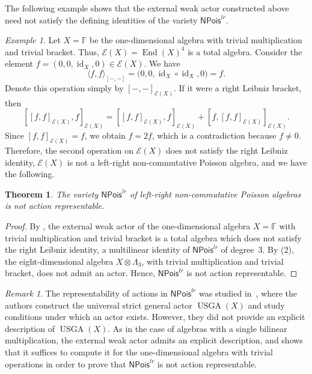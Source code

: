 \documentclass[reqno,a4paper]{amsart}
\theoremstyle{plain}
\newtheorem{theorem}[subsection]{Theorem}
\theoremstyle{definition}
\theoremstyle{remark}
\newtheorem{remark}[subsection]{Remark}
\newtheorem{example}[subsection]{Example}
\numberwithin{equation}{section}
\newcommand{\F}{\mathbb{F}}
\newcommand{\E}{\mathcal{E}}
\DeclareMathOperator{\End}{End}
\DeclareMathOperator{\USGA}{USGA}
\DeclareMathOperator{\id}{id}
\newcommand{\NP}{\ensuremath{\mathsf{NPois}}}
\begin{document}
The following example shows that the external weak actor constructed above need not satisfy the defining identities of the variety $\NP^{lr}$.

\begin{example}\label{ExampleExternalNPlrNotLeibniz}
Let $X=\F$ be the one-dimensional algebra with trivial multiplication and trivial bracket. Thus, $\E(X)=\End(X)^4$ is a total algebra. Consider the element $f=(0,0,\id_X,0)\in\E(X)$. We have
\[
\langle f,f\rangle_{[-,-]}=\bigl(
0,
0,
\id_X\circ\id_X,
0
\bigr)=f.
\]
Denote this operation simply by $[-,-]_{\E(X)}$. If it were a right Leibniz bracket, then
\[
[[f,f]_{\E(X)},f]_{\E(X)}
=
[[f,f]_{\E(X)},f]_{\E(X)}
+
[f,[f,f]_{\E(X)}]_{\E(X)}.
\]
Since $[f,f]_{\E(X)}=f$, we obtain $f=2f$, which is a contradiction because $f\neq0$. Therefore, the second operation on $\E(X)$ does not satisfy the right Leibniz identity, $\E(X)$ is not a left-right non-commutative Poisson algebra, and we have the following.
\end{example}

\begin{theorem}\label{TheoremNPlrNotAR}
The variety $\NP^{lr}$ of left-right non-commutative Poisson algebras is not action representable.
\end{theorem}

\begin{proof}
By , the external weak actor of the one-dimensional algebra $X=\F$ with trivial multiplication and trivial bracket is a total algebra which does not satisfy the right Leibniz identity, a multilinear identity of $\NP^{lr}$ of degree~$3$. By (2), the eight-dimensional algebra $X\otimes\Lambda_3$, with trivial multiplication and trivial bracket, does not admit an actor. Hence, $\NP^{lr}$ is not action representable.
\end{proof}

\begin{remark}\label{RemarkNPlrTotalityOpen}
The representability of actions in $\NP^{lr}$ was studied in~\cite[Section~4]{CasasDatuashviliLadraNPLR}, where the authors construct the universal strict general actor $\USGA(X)$ and study conditions under which an actor exists. However, they did not provide an explicit description of $\USGA(X)$. As in the case of algebras with a single bilinear multiplication, the external weak actor admits an explicit description, and  shows that it suffices to compute it for the one-dimensional algebra with trivial operations in order to prove that $\NP^{lr}$ is not action representable.
\end{remark}
\end{document}
